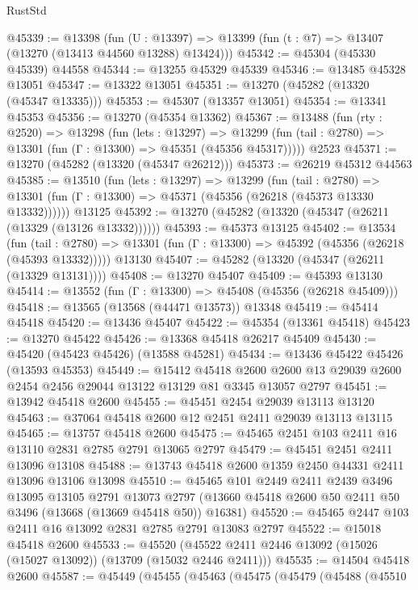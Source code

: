 \begin{lexlean}{RustStd}
\begin{coremodule}
@45339 := @13398
    (fun (U : @13397) => @13399 (fun (t : @7) => @13407 (@13270 (@13413 @44560 @13288) @13424)))
@45342 := @45304 (@45330 @45339) @44558
@45344 := @13255 @45329 @45339
@45346 := @13485 @45328 @13051
@45347 := @13322 @13051
@45351 := @13270 (@45282 (@13320 (@45347 @13335)))
@45353 := @45307 (@13357 @13051)
@45354 := @13341 @45353
@45356 := @13270 (@45354 @13362)
@45367 := @13488
    (fun (rty : @2520) =>
    @13298
      (fun (lets : @13297) =>
      @13299 (fun (tail : @2780) => @13301 (fun (Γ : @13300) => @45351 (@45356 @45317)))))
    @2523
@45371 := @13270 (@45282 (@13320 (@45347 @26212)))
@45373 := @26219 @45312 @44563
@45385 := @13510
    (fun (lets : @13297) =>
    @13299
      (fun (tail : @2780) =>
      @13301 (fun (Γ : @13300) => @45371 (@45356 (@26218 (@45373 @13330 @13332))))))
    @13125
@45392 := @13270 (@45282 (@13320 (@45347 (@26211 (@13329 (@13126 @13332))))))
@45393 := @45373 @13125
@45402 := @13534
    (fun (tail : @2780) => @13301 (fun (Γ : @13300) => @45392 (@45356 (@26218 (@45393 @13332)))))
    @13130
@45407 := @45282 (@13320 (@45347 (@26211 (@13329 @13131))))
@45408 := @13270 @45407
@45409 := @45393 @13130
@45414 := @13552 (fun (Γ : @13300) => @45408 (@45356 (@26218 @45409)))
@45418 := @13565 (@13568 (@44471 @13573)) @13348
@45419 := @45414 @45418
@45420 := @13436 @45407
@45422 := @45354 (@13361 @45418)
@45423 := @13270 @45422
@45426 := @13368 @45418 @26217 @45409
@45430 := @45420 (@45423 @45426) (@13588 @45281)
@45434 := @13436 @45422 @45426 (@13593 @45353)
@45449 := @15412
    @45418
    @2600
    @2600
    @13
    @29039
    @2600
    @2454
    @2456
    @29044
    @13122
    @13129
    @81
    @3345
    @13057
    @2797
@45451 := @13942 @45418 @2600
@45455 := @45451 @2454 @29039 @13113 @13120
@45463 := @37064 @45418 @2600 @12 @2451 @2411 @29039 @13113 @13115
@45465 := @13757 @45418 @2600
@45475 := @45465 @2451 @103 @2411 @16 @13110 @2831 @2785 @2791 @13065 @2797
@45479 := @45451 @2451 @2411 @13096 @13108
@45488 := @13743 @45418 @2600 @1359 @2450 @44331 @2411 @13096 @13106 @13098
@45510 := @45465
    @101
    @2449
    @2411
    @2439
    @3496
    @13095
    @13105
    @2791
    @13073
    @2797
    (@13660 @45418 @2600 @50 @2411 @50 @3496 (@13668 (@13669 @45418 @50)) @16381)
@45520 := @45465 @2447 @103 @2411 @16 @13092 @2831 @2785 @2791 @13083 @2797
@45522 := @15018 @45418 @2600
@45533 := @45520 (@45522 @2411 @2446 @13092 (@15026 (@15027 @13092)) (@13709 (@15032 @2446 @2411)))
@45535 := @14504 @45418 @2600
@45587 := @45449
    (@45455
      (@45463
        (@45475
          (@45479
            (@45488
              (@45510

\end{coremodule}
\end{lexlean}
